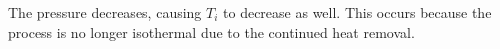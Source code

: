 The pressure decreases, causing \( T_i \) to decrease as well. This occurs because the process is no longer isothermal due to the continued heat removal.